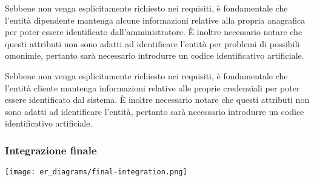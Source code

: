 Sebbene non venga esplicitamente richiesto nei requisiti, è fondamentale che
l'entità dipendente mantenga alcune informazioni relative alla propria
anagrafica per poter essere identificato dall'amministratore.
È inoltre necessario notare che questi attributi non sono adatti ad
identificare l'entità per problemi di possibili omonimie, pertanto
sarà necessario introdurre un codice identificativo artificiale.

Sebbene non venga esplicitamente richiesto nei requisiti, è fondamentale che
l'entità cliente mantenga informazioni relative alle proprie credenziali per
poter essere identificato dal sistema.
È inoltre necessario notare che questi attributi non sono adatti ad
identificare l'entità, pertanto sarà necessario introdurre un codice
identificativo artificiale.

\subsubsection*{Integrazione finale}
%
%
\texttt{[image: er\_diagrams/final-integration.png]}

